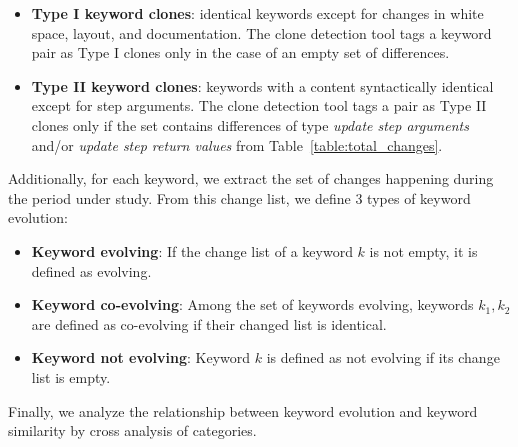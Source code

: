\begin{itemize}
    \item \textbf{Type I keyword clones}: identical keywords except for changes in white space, layout, and documentation. The clone detection tool tags a keyword pair as Type I clones only in the case of an empty set of differences.
  
    \item \textbf{Type II keyword clones}: keywords with a content syntactically identical except for step arguments. The clone detection tool tags a pair as Type II clones only if the set contains differences of type \emph{update step arguments} and/or \emph{update step return values} from Table~\ref{table:total_changes}.
\end{itemize}

 Additionally, for each keyword, we extract the set of changes happening during the period under study. From this change list, we define 3 types of keyword evolution:
 
 \begin{itemize}
   \item \textbf{Keyword evolving}: If the change list of a keyword $k$ is not empty, it is defined as evolving.
   
   \item \textbf{Keyword co-evolving}: Among the set of keywords evolving, keywords $k_1, k_2$ are defined as co-evolving if their changed list is identical.
   
   \item \textbf{Keyword not evolving}: Keyword $k$ is defined as not evolving if its change list is empty. 
 \end{itemize}

 Finally, we analyze the relationship between keyword evolution and keyword similarity by cross analysis of categories.